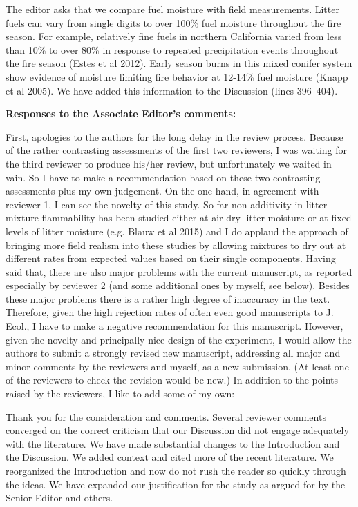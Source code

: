 \documentclass[letterpaper, 12pt]{letter}
\begin{document}
\begin{letter}{}
The editor asks that we compare fuel moisture with field measurements. Litter
fuels can vary from single digits to over 100\% fuel moisture throughout the
fire season. For example, relatively fine fuels in northern California varied
from less than 10\% to over 80\% in response to repeated precipitation events
throughout the fire season (Estes et al 2012). Early season burns in this mixed
conifer system show evidence of moisture limiting fire behavior at 12-14\% fuel
moisture (Knapp et al 2005). We have added this information to the Discussion
(lines 396--404).

{\bf Responses to the Associate Editor's comments:}

\begin{quoting}
  First, apologies to the authors for the long delay in the review process.
  Because of the rather contrasting assessments of the first two reviewers, I
  was waiting for the third reviewer to produce his/her review, but
  unfortunately we waited in vain. So I have to make a recommendation based on
  these two contrasting assessments plus my own judgement. On the one hand, in
  agreement with reviewer 1, I can see the novelty of this study. So far
  non-additivity in litter mixture flammability has been studied either at
  air-dry litter moisture or at fixed levels of litter moisture (e.g. Blauw et
  al 2015) and I do applaud the approach of bringing more field realism into
  these studies by allowing mixtures to dry out at different rates from
  expected values based on their single components. Having said that, there are
  also major problems with the current manuscript, as reported especially by
  reviewer 2 (and some additional ones by myself, see below). Besides these
  major problems there is a rather high degree of inaccuracy in the text.
  Therefore, given the high rejection rates of often even good manuscripts to
  J. Ecol., I have to make a negative recommendation for this manuscript.
  However, given the novelty and principally nice design of the experiment, I
  would allow the authors to submit a strongly revised new manuscript,
  addressing all major and minor comments by the reviewers and myself, as a new
  submission. (At least one of the reviewers to check the revision would be
  new.) In addition to the points raised by the reviewers, I like to add some
  of my own:
\end{quoting}

Thank you for the consideration and comments. Several reviewer comments
converged on the correct criticism that our Discussion did not engage
adequately with the literature. We have made substantial changes to the
Introduction and the Discussion. We added context and cited more of the
recent literature. We reorganized the Introduction and now do not rush the
reader so quickly through the ideas. We have expanded our justification for the
study as argued for by the Senior Editor and others.



\end{letter}
\end{document}
